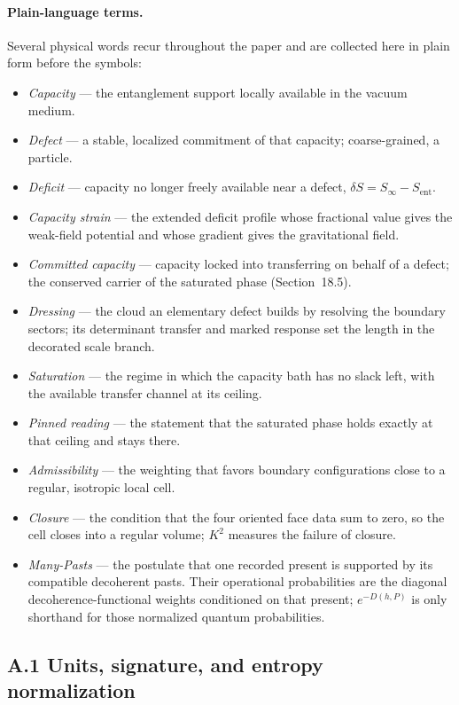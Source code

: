 \documentclass[11pt]{article}
\begin{document}
\paragraph{Plain-language terms.}
Several physical words recur throughout the paper and are collected here in plain form before the symbols:
\begin{itemize}
\item \emph{Capacity} --- the entanglement support locally available in the vacuum medium.
\item \emph{Defect} --- a stable, localized commitment of that capacity; coarse-grained, a particle.
\item \emph{Deficit} --- capacity no longer freely available near a defect, $\delta S=S_\infty-S_{\mathrm{ent}}$.
\item \emph{Capacity strain} --- the extended deficit profile whose fractional value gives the weak-field potential and whose gradient gives the gravitational field.
\item \emph{Committed capacity} --- capacity locked into transferring on behalf of a defect; the conserved carrier of the saturated phase (Section~18.5).
\item \emph{Dressing} --- the cloud an elementary defect builds by resolving the boundary sectors; its determinant transfer and marked response set the length in the decorated scale branch.
\item \emph{Saturation} --- the regime in which the capacity bath has no slack left, with the available transfer channel at its ceiling.
\item \emph{Pinned reading} --- the statement that the saturated phase holds exactly at that ceiling and stays there.
\item \emph{Admissibility} --- the weighting that favors boundary configurations close to a regular, isotropic local cell.
\item \emph{Closure} --- the condition that the four oriented face data sum to zero, so the cell closes into a regular volume; $K^2$ measures the failure of closure.
\item \emph{Many-Pasts} --- the postulate that one recorded present is supported by its compatible decoherent pasts. Their operational probabilities are the diagonal decoherence-functional weights conditioned on that present; $e^{-D(h,P)}$ is only shorthand for those normalized quantum probabilities.
\end{itemize}

\subsection*{A.1 Units, signature, and entropy normalization}
\end{document}
